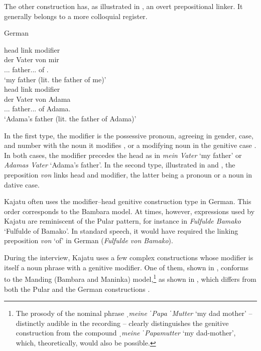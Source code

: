 \documentclass[output=paper]{langscibook}
\begin{document}
\noindent
The other construction has, as illustrated in , an overt prepositional linker. It generally belongs to a more colloquial register.

    \begin{exe}
        \ex\label{fanego:ex:18} German
        \begin{xlist}
            \ex\label{fanego:ex:18a} 
            \glll head {} link modifier \\
            der Vater von mir \\
            \Def.\M.\SG.\NOM{} father.\M.\SG.\NOM{} of \First\SG.\DAT{} \\
            \glt ‘my father (lit. the father of me)’ \\
            \ex\label{fanego:ex:18b} 
            \glll head {} link modifier \\
            der Vater von Adama \\
            \Def.\M.\SG.\NOM{} father.\M.\SG.\NOM{} of Adama.\DAT{} \\
            \glt ‘Adama’s father (lit. the father of Adama)’
        \end{xlist}
    \end{exe}
\noindent
In the first type, the modifier is the possessive pronoun, agreeing in gender, case, and number with the noun it modifies , or a modifying noun in the genitive case . In both cases, the modifier precedes the head as in \textit{mein Vater} ‘my father’ or \textit{Adamas Vater} ‘Adama’s father’. In the second type, illustrated in  and , the preposition \textit{von} links head and modifier, the latter being a pronoun or a noun in dative case.

Kajatu often uses the modifier–head genitive construction type in German. This order corresponds to the Bambara model. At times, however, expressions used by Kajatu are reminiscent of the Pular pattern, for instance in \textit{Fulfulde Bamako} ‘Fulfulde of Bamako’. In standard speech, it would have required the linking preposition \textit{von} ‘of’ in German (\textit{Fulfulde von Bamako}).

During the interview, Kajatu uses a few complex constructions whose modifier is itself a noun phrase with a genitive modifier. One of them, shown in , conforms to the Manding (Bambara and Maninka) model,\footnote{The prosody of the nominal phrase \textit{ˌmeine ˈPapa ˈMutter} ‘my dad mother’ – distinctly audible in the recording – clearly distinguishes the genitive construction from the compound \textit{ˌmeine ˈPapamutter} ‘my dad-mother’, which, theoretically, would also be possible.} as shown in , which differs from both the Pular  and the German constructions .
\end{document}

